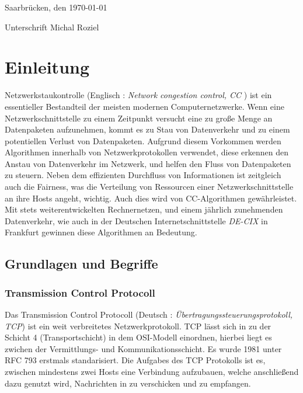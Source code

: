 \documentclass[paper=a4,fontsize=12pt,ngerman]{scrartcl}
\begin{document}
Saarbrücken, den \today

\smallskip
Unterschrift  Michal Roziel




\clearpage
\tableofcontents 

\clearpage
{}



\section{Einleitung}

Netzwerkstaukontrolle (Englisch : \textit{ Network congestion control, CC }) ist ein essentieller Bestandteil der 
meisten modernen Computernetzwerke. 
Wenn eine Netzwerkschnittstelle zu einem Zeitpunkt versucht eine zu große Menge an Datenpaketen aufzunehmen,
kommt es zu Stau von Datenverkehr und zu einem potentiellen Verlust von Datenpaketen.
Aufgrund diesem Vorkommen werden Algorithmen innerhalb von Netzwerkprotokollen verwendet, diese erkennen den Anstau von Datenverkehr im Netzwerk,
und helfen den Fluss von Datenpaketen zu steuern. Neben dem effizienten Durchfluss von Informationen ist zeitgleich auch die Fairness, 
was die Verteilung von Ressourcen einer Netzwerkschnittstelle an ihre Hosts angeht, wichtig. Auch dies wird von CC-Algorithmen gewährleistet.
\newline
Mit stets weiterentwickelten Rechnernetzen, und einem jährlich zunehmenden Datenverkehr, wie auch in der Deutschen Internetschnittstelle
\textit{DE-CIX}\cite{DE-CIX2025} in Frankfurt gewinnen diese Algorithmen an Bedeutung. 





\subsection{Grundlagen und Begriffe}

\subsubsection{Transmission Control Protocoll}

Das Transmission Control Protocoll (Deutsch : \textit{Übertragungssteuerungsprotokoll, TCP}) ist ein weit verbreitetes Netzwerkprotokoll. 
TCP lässt sich in zu der Schicht 4 (Transportschicht) in dem OSI-Modell einordnen, hierbei liegt es zwichen der Vermittlungs- und Kommunikationsschicht.
\newline Es wurde 1981 unter RFC 793 erstmals standarisiert.   %
\newline
Die Aufgabes des TCP Protokolls ist es, zwischen mindestens zwei Hosts eine Verbindung aufzubauen, welche anschließend dazu genutzt wird,  
Nachrichten in zu verschicken und zu empfangen.
\end{document}
